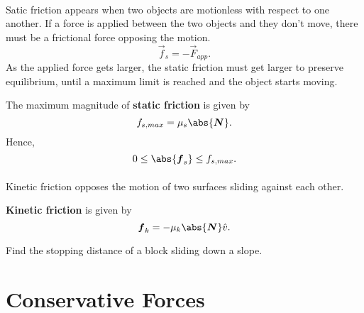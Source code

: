 \documentclass[../classical_mechanics.tex]{subfiles}
\begin{document}
        \paragraph{}
        Satic friction appears when two objects are motionless with respect to one another.
        If a force is applied between the two objects and they don't move, there must be a frictional force opposing the motion.
        \begin{equation}
            \vec{f}_s=-\vec{F}_{app}.
        \end{equation}
        As the applied force gets larger, the static friction must get larger to preserve equilibrium, until a maximum limit is reached and the object starts moving.
        \begin{definition}
            The maximum magnitude of \textbf{static friction} is given by
            \begin{equation}
                f_{s,max}=\mu_s\abs{\vec{N}}.
            \end{equation}
            Hence,
            \begin{equation}
                0\leq\abs{\vec{f}_s}\leq f_{s,max}.
            \end{equation}
        \end{definition}

        \paragraph{}
        Kinetic friction opposes the motion of two surfaces sliding against each other.
        \begin{definition}
            \textbf{Kinetic friction} is given by
            \begin{equation}
                \vec{f}_k=-\mu_k\abs{\vec{N}}\hat{v}.
            \end{equation}
        \end{definition}
        \begin{example}
            Find the stopping distance of a block sliding down a slope.
        \end{example}

    \section{Conservative Forces}
\end{document}
